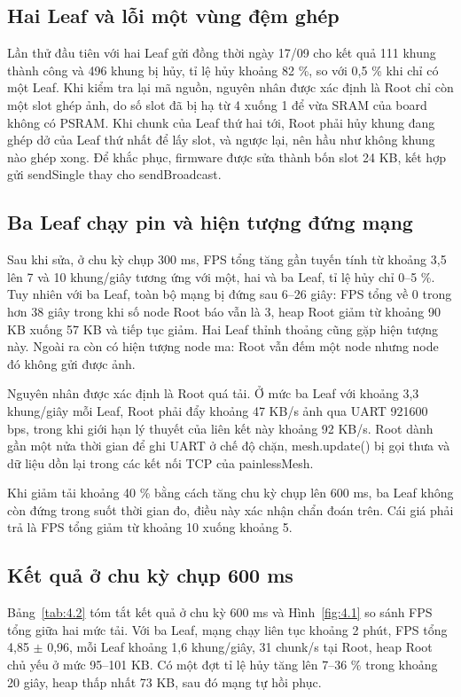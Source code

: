 \subsection{Hai Leaf và lỗi một vùng đệm ghép}

Lần thử đầu tiên với hai Leaf gửi đồng thời ngày 17/09 cho kết quả 111 khung thành công và 496 khung bị hủy, tỉ lệ hủy khoảng 82 \%, so với 0,5 \% khi chỉ có một Leaf. Khi kiểm tra lại mã nguồn, nguyên nhân được xác định là Root chỉ còn một slot ghép ảnh, do số slot đã bị hạ từ 4 xuống 1 để vừa SRAM của board không có PSRAM. Khi chunk của Leaf thứ hai tới, Root phải hủy khung đang ghép dở của Leaf thứ nhất để lấy slot, và ngược lại, nên hầu như không khung nào ghép xong. Để khắc phục, firmware được sửa thành bốn slot 24 KB, kết hợp gửi sendSingle thay cho sendBroadcast.


\subsection{Ba Leaf chạy pin và hiện tượng đứng mạng}

Sau khi sửa, ở chu kỳ chụp 300 ms, FPS tổng tăng gần tuyến tính từ khoảng 3,5 lên 7 và 10 khung/giây tương ứng với một, hai và ba Leaf, tỉ lệ hủy chỉ 0–5 \%. Tuy nhiên với ba Leaf, toàn bộ mạng bị đứng sau 6–26 giây: FPS tổng về 0 trong hơn 38 giây trong khi số node Root báo vẫn là 3, heap Root giảm từ khoảng 90 KB xuống 57 KB và tiếp tục giảm. Hai Leaf thỉnh thoảng cũng gặp hiện tượng này. Ngoài ra còn có hiện tượng node ma: Root vẫn đếm một node nhưng node đó không gửi được ảnh.

Nguyên nhân được xác định là Root quá tải. Ở mức ba Leaf với khoảng 3,3 khung/giây mỗi Leaf, Root phải đẩy khoảng 47 KB/s ảnh qua UART 921600 bps, trong khi giới hạn lý thuyết của liên kết này khoảng 92 KB/s. Root dành gần một nửa thời gian để ghi UART ở chế độ chặn, mesh.update() bị gọi thưa và dữ liệu dồn lại trong các kết nối TCP của painlessMesh.

Khi giảm tải khoảng 40 \% bằng cách tăng chu kỳ chụp lên 600 ms, ba Leaf không còn đứng trong suốt thời gian đo, điều này xác nhận chẩn đoán trên. Cái giá phải trả là FPS tổng giảm từ khoảng 10 xuống khoảng 5.


\subsection{Kết quả ở chu kỳ chụp 600 ms}

Bảng~\ref{tab:4.2} tóm tắt kết quả ở chu kỳ 600 ms và Hình~\ref{fig:4.1} so sánh FPS tổng giữa hai mức tải. Với ba Leaf, mạng chạy liên tục khoảng 2 phút, FPS tổng 4,85 $\pm$ 0,96, mỗi Leaf khoảng 1,6 khung/giây, 31 chunk/s tại Root, heap Root chủ yếu ở mức 95–101 KB. Có một đợt tỉ lệ hủy tăng lên 7–36 \% trong khoảng 20 giây, heap thấp nhất 73 KB, sau đó mạng tự hồi phục.



